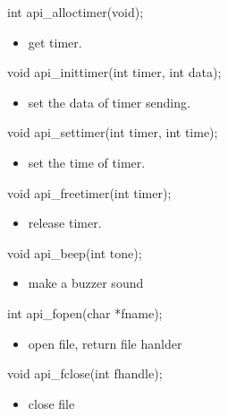 \documentclass{swfcthesis}
\begin{document}
\begin{ccode}
int api_alloctimer(void);
\end{ccode}
\begin{itemize}
\item get timer.
\end{itemize}



\begin{ccode}
void api_inittimer(int timer, int data);
\end{ccode}
\begin{itemize}
\item set the data of timer sending.
\end{itemize}


\begin{ccode}
void api_settimer(int timer, int time);
\end{ccode}
\begin{itemize}
\item set the time of timer.
\end{itemize}



\begin{ccode}
void api_freetimer(int timer);
\end{ccode}
\begin{itemize}
\item release timer.
\end{itemize}




\begin{ccode}
void api_beep(int tone);
\end{ccode}
\begin{itemize}
\item make a buzzer sound
\end{itemize}



\begin{ccode}
int api_fopen(char *fname);
\end{ccode}
\begin{itemize}
\item open file, return file hanlder
\end{itemize}



\begin{ccode}
void api_fclose(int fhandle);
\end{ccode}
\begin{itemize}
\item close file
\end{itemize}
\end{document}
